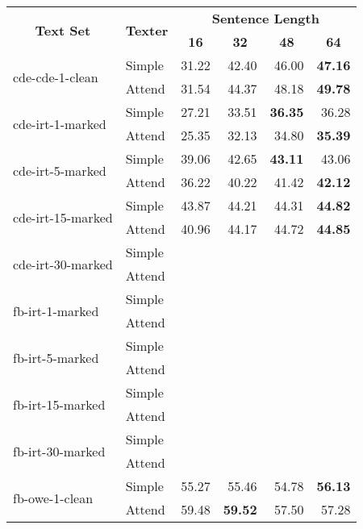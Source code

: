 \begin{tabular}{| l | l | r | r | r | r |}
    \hline

    \multicolumn{1}{|c|}{\multirow{2}{*}{\textbf{Text Set}}} &
    \multicolumn{1}{|c|}{\multirow{2}{*}{\textbf{Texter}}} &
    \multicolumn{4}{|c|}{\textbf{Sentence Length}} \\

    &
    &
    \multicolumn{1}{|c|}{\textbf{16}} &
    \multicolumn{1}{|c|}{\textbf{32}} &
    \multicolumn{1}{|c|}{\textbf{48}} &
    \multicolumn{1}{|c|}{\textbf{64}} \\

    \hline \hline

    \multirow{2}{*}{cde-cde-1-clean}
    & Simple & 31.22 & 42.40 & 46.00 & \textbf{47.16} \\
    & Attend & 31.54 & 44.37 & 48.18 & \textbf{49.78} \\ \hline

    \multirow{2}{*}{cde-irt-1-marked}
    & Simple & 27.21 & 33.51 & \textbf{36.35} & 36.28 \\
    & Attend & 25.35 & 32.13 & 34.80 & \textbf{35.39} \\ \hline

    \multirow{2}{*}{cde-irt-5-marked}
    & Simple & 39.06 & 42.65 & \textbf{43.11} & 43.06 \\
    & Attend & 36.22 & 40.22 & 41.42 & \textbf{42.12} \\ \hline

    \multirow{2}{*}{cde-irt-15-marked}
    & Simple & 43.87 & 44.21 & 44.31 & \textbf{44.82} \\
    & Attend & 40.96 & 44.17 & 44.72 & \textbf{44.85} \\ \hline

    \multirow{2}{*}{cde-irt-30-marked}
    & Simple &  &  &  &  \\
    & Attend &  &  &  &  \\ \hline \hline

    \multirow{2}{*}{fb-irt-1-marked}
    & Simple &  &  &  &  \\
    & Attend &  &  &  &  \\ \hline

    \multirow{2}{*}{fb-irt-5-marked}
    & Simple &  &  &  &  \\
    & Attend &  &  &  &  \\ \hline

    \multirow{2}{*}{fb-irt-15-marked}
    & Simple &  &  &  &  \\
    & Attend &  &  &  &  \\ \hline

    \multirow{2}{*}{fb-irt-30-marked}
    & Simple &  &  &  &  \\
    & Attend &  &  &  &  \\ \hline

    \multirow{2}{*}{fb-owe-1-clean}
    & Simple & 55.27 & 55.46 & 54.78 & \textbf{56.13} \\
    & Attend & 59.48 & \textbf{59.52} & 57.50 & 57.28 \\ \hline

\end{tabular}
